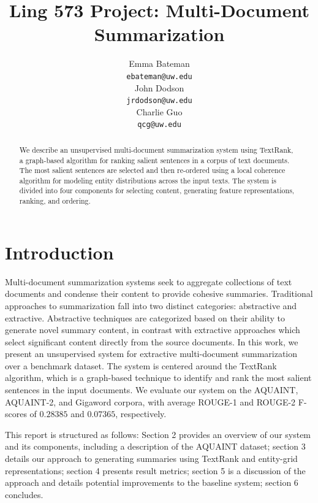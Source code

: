 \documentclass[11pt]{article}
\title{Ling 573 Project: Multi-Document Summarization}
\author{Emma Bateman \\
  {\tt ebateman@uw.edu} \\\And
  John Dodson \\
  {\tt jrdodson@uw.edu} \\\And
  Charlie Guo \\
  {\tt qcg@uw.edu}
  }
\date{}
\begin{document}
\maketitle
\begin{abstract}
We describe an unsupervised multi-document summarization system using TextRank, a graph-based algorithm for ranking salient sentences in a corpus of text documents. The most salient sentences are selected and then re-ordered using a local coherence algorithm for modeling entity distributions across the input texts. The system is divided into four components for selecting content, generating feature representations, ranking, and ordering.
\end{abstract}

\section{Introduction}

Multi-document summarization systems seek to aggregate collections of text documents and condense their content to provide cohesive summaries. Traditional approaches to summarization fall into two distinct categories: abstractive and extractive. Abstractive techniques are categorized based on their ability to generate novel summary content, in contrast with extractive approaches which select significant content directly from the source documents. In this work, we present an unsupervised system for extractive multi-document summarization over a benchmark dataset. The system is centered around the TextRank algorithm, which is a graph-based technique to identify and rank the most salient sentences in the input documents. We evaluate our system on the AQUAINT, AQUAINT-2, and Gigaword corpora, with average ROUGE-1 and ROUGE-2 F-scores of $0.28385$ and $0.07365$, respectively. 

This report is structured as follows: Section 2 provides an overview of our system and its components, including a description of the AQUAINT dataset; section 3 details our approach to generating summaries using TextRank and entity-grid representations; section 4 presents result metrics; section 5 is a discussion of the approach and details potential improvements to the baseline system; section 6 concludes.
\end{document}
